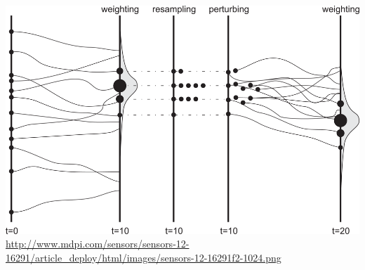 \documentclass[11pt,compress,aspectratio=1610]{beamer}
\begin{document}
\begin{frame}
\begin{center}
    \includegraphics[width=\textwidth,height=0.9\textheight,keepaspectratio=true]{../images/particle.png}
    \\
    {\scriptsize \url{http://www.mdpi.com/sensors/sensors-12-16291/article_deploy/html/images/sensors-12-16291f2-1024.png} }
\end{center}
\end{frame}
\end{document}
